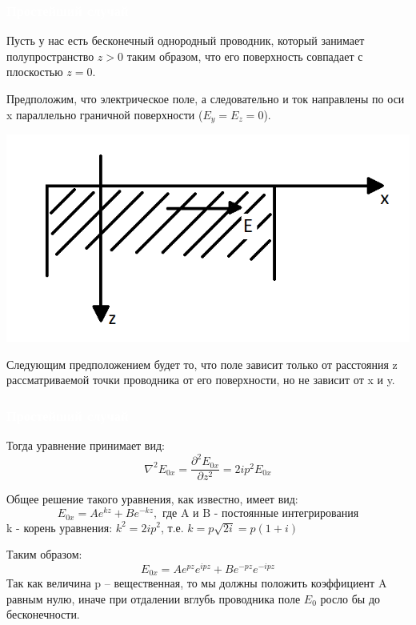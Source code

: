 \documentclass[aspectratio=169]{beamer}
\begin{document}
\begin{frame}
\frametitle{\textcolor{white}{Простейший случай}}

Пусть у нас есть бесконечный однородный проводник, который занимает полупространство $z > 0$ таким образом, что его поверхность совпадает с плоскостью $z = 0$.

Предположим, что электрическое поле, а следовательно и ток направлены по оси x параллельно граничной поверхности ($E_y = E_z = 0$).
\begin{center}
\includegraphics[scale=0.5]{01.png}
\end{center}
Следующим предположением будет то, что поле зависит только от расстояния z  рассматриваемой точки проводника от его поверхности, но не зависит от x и y.
\end{frame}

\begin{frame}
\frametitle{\textcolor{white}{Простейший случай}}
Тогда уравнение принимает вид:
\begin{equation*}
\nabla^2 E_{0x} = \frac{\partial^2 E_{0x}}{\partial z^2} = 2ip^2E_{0x}
\end{equation*}

Общее решение такого уравнения, как известно, имеет вид:
\begin{equation*}
E_{0x} = Ae^{kz} + Be^{-kz}, \text{ где A и B - постоянные интегрирования}
\end{equation*}
k - корень уравнения: $k^2  =2ip^2$, т.е. $k = p \sqrt{2i} = p (1 + i)$

Таким образом:
\begin{equation*}
E_{0x} = Ae^{pz}e^{ipz} + Be^{-pz}e^{-ipz}
\end{equation*}
Так как величина p -- вещественная, то мы должны положить коэффициент A равным нулю, иначе при отдалении вглубь проводника поле $E_0$ росло бы до бесконечности.
\end{frame}
\end{document}
